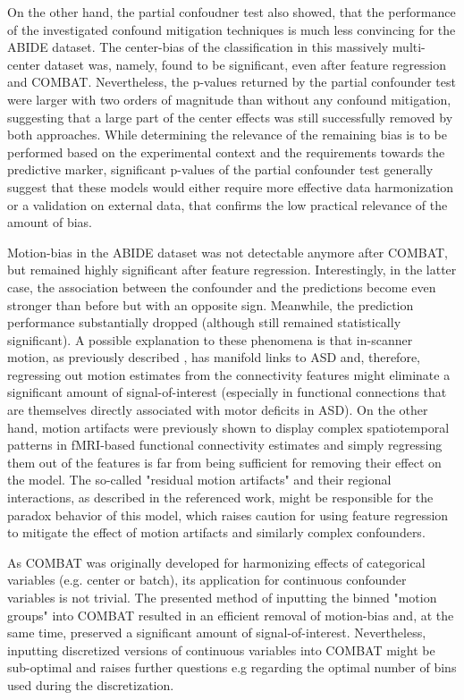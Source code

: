 \documentclass{article}
\begin{document}
On the other hand, the partial confoudner test also showed, that the performance of the investigated confound mitigation techniques is much less convincing for the ABIDE dataset. The center-bias of the classification in this massively multi-center dataset was, namely, found to be significant, even after feature regression and COMBAT. Nevertheless, the p-values returned by the partial confounder test were larger with two orders of magnitude than without any confound mitigation, suggesting that a large part of the center effects was still successfully removed by both approaches. While determining the relevance of the remaining bias is to be performed based on the experimental context and the requirements towards the predictive marker, significant p-values of the partial confounder test generally suggest that these models would either require more effective data harmonization or a validation on external data, that confirms the low practical relevance of the amount of bias.

Motion-bias in the ABIDE dataset was not detectable anymore after COMBAT, but remained highly significant after feature regression.
Interestingly, in the latter case, the association between the confounder and the predictions become even stronger than before but with an opposite sign. Meanwhile, the prediction performance substantially dropped (although still remained statistically significant). 
A possible explanation to these phenomena is that in-scanner motion, as previously described \citep{fournier2010motor, anzulewicz2016toward}, has manifold links to ASD and, therefore, regressing out motion estimates from the connectivity features might eliminate a significant amount of signal-of-interest (especially in functional connections that are themselves directly associated with motor deficits in ASD).
On the other hand, motion artifacts were previously shown to display complex spatiotemporal patterns in fMRI-based functional connectivity estimates \citep{spisak2014voxel} and simply regressing them out of the features is far from being sufficient for removing their effect on the model. The so-called "residual motion artifacts" and their regional interactions, as described in the referenced work, might be responsible for the paradox behavior of this model, which raises caution for using feature regression to mitigate the effect of motion artifacts and similarly complex confounders.
 
 As COMBAT was originally developed for harmonizing effects of categorical variables (e.g. center or batch), its application for continuous confounder variables is not trivial. The presented method of inputting the binned "motion groups" into COMBAT resulted in an efficient removal of motion-bias and, at the same time, preserved a significant amount of signal-of-interest. 
 Nevertheless, inputting discretized versions of continuous variables into COMBAT might be sub-optimal and raises further questions e.g regarding the optimal number of bins used during the discretization.
 
\end{document}
